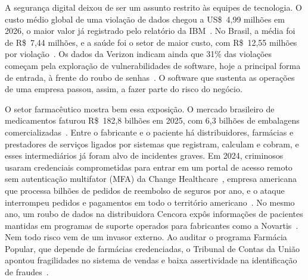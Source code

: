 \documentclass[conference]{IEEEtran}
\begin{document}


A segurança digital deixou de ser um assunto restrito às equipes de tecnologia. O custo médio global de uma violação de dados chegou a US\$~4,99 milhões em 2026, o maior valor já registrado pelo relatório da IBM~\cite{ibm2026}. No Brasil, a média foi de R\$~7,44 milhões, e a saúde foi o setor de maior custo, com R\$~12,55 milhões por violação~\cite{lobo2026}. Os dados da Verizon indicam ainda que 31\% das violações começam pela exploração de vulnerabilidades de software, hoje a principal forma de entrada, à frente do roubo de senhas~\cite{verizon2026}. O software que sustenta as operações de uma empresa passou, assim, a fazer parte do risco do negócio.

O setor farmacêutico mostra bem essa exposição. O mercado brasileiro de medicamentos faturou R\$~182,8 bilhões em 2025, com 6,3 bilhões de embalagens comercializadas~\cite{anvisa2026}. Entre o fabricante e o paciente há distribuidores, farmácias e prestadores de serviços ligados por sistemas que registram, calculam e cobram, e esses intermediários já foram alvo de incidentes graves. Em 2024, criminosos usaram credenciais comprometidas para entrar em um portal de acesso remoto sem autenticação multifator (MFA) da Change Healthcare~\cite{witty2024}, empresa americana que processa bilhões de pedidos de reembolso de seguros por ano, e o ataque interrompeu pedidos e pagamentos em todo o território americano~\cite{murphy2024}. No mesmo ano, um roubo de dados na distribuidora Cencora expôs informações de pacientes mantidas em programas de suporte operados para fabricantes como a Novartis~\cite{toulas2024}. Nem todo risco vem de um invasor externo. Ao auditar o programa Farmácia Popular, que depende de farmácias credenciadas, o Tribunal de Contas da União apontou fragilidades no sistema de vendas e baixa assertividade na identificação de fraudes~\cite{tcu2023}.
\end{document}
